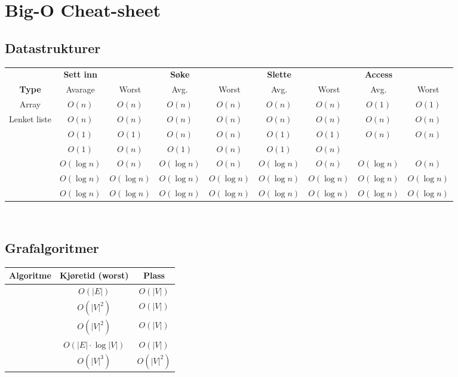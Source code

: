 \section{\color{red} Big-O Cheat-sheet}
\subsection*{Datastrukturer}

\begin{table}[H]
\footnotesize
\centering
\begin{tabular}{c || c  c | c c | c c | c c} 
	                   & \textbf{Sett inn} &               & \textbf{Søke} & & \textbf{Slette} & & \textbf{Access} & \\
	 \textbf{Type}     & {Avarage}         & {Worst}       &Avg.&Worst&Avg.&Worst&Avg.&Worst\\ \hline
	 Array & $ O(n) $ & $ O(n) $ & $ O(n) $ & $ O(n) $ & $ O(n) $ & $ O(n) $ & $ O(1) $ & $ O(1) $ \\
	 Lenket liste & $ O(n) $ & $ O(n) $ & $ O(n) $ & $ O(n) $ & $ O(n) $ & $ O(n) $ & $ O(n) $ & $ O(n) $ \\
	 \nameref{ko_stack} & $ O(1) $ & $ O(1) $ & $ O(n) $ & $ O(n) $ & $ O(1) $ & $ O(1) $ & $ O(n) $ & $ O(n) $ \\
	 \nameref{hashmap} & $ O(1) $ & $ O(n) $ & $ O(1) $ & $ O(n) $ & $ O(1) $ & $ O(n) $ & & \\
	\nameref{bintraer} & $ O(\log n) $     & $ O(n) $   & $ O(\log n) $     & $ O(n) $  & $ O(\log n) $     & $ O(n) $  & $ O(\log n) $     & $ O(n) $ \\
	 \nameref{rb_tre}  & $ O(\log n) $     & $ O(\log n) $ & $ O(\log n) $     & $ O(\log n) $& $ O(\log n) $     & $ O(\log n) $& $ O(\log n) $     & $ O(\log n) $\\
	 \nameref{b-tre}   & $ O(\log n) $     & $ O(\log n) $ & $ O(\log n) $     & $ O(\log n) $& $ O(\log n) $     & $ O(\log n) $& $ O(\log n) $     & $ O(\log n) $
\end{tabular}
\end{table}


~\\\subsection*{Grafalgoritmer}
\begin{center}
\begin{tabular}{c || c | c}
	\textbf{Algoritme} & \textbf{Kjøretid (worst)}   & \textbf{Plass} \\ \hline
	  \nameref{dfs}    & $ O(|E|) $                  & $ O(|V|) $     \\
	\nameref{dijkstra} & $ O(|V|^2) $                & $ O(|V|) $     \\
	  \nameref{prim}   & $ O(|V|^2) $                & $ O(|V|) $     \\
	\nameref{kruskal}  & $ O(|E| \cdot \log |V|) $ & $ O(|V|) $     \\
	 \nameref{floyd}   & $ O(|V|^3) $                & $ O(|V|^2) $
\end{tabular}
\end{center}


